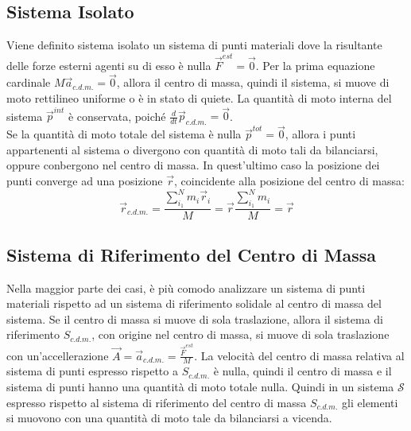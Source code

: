 \documentclass{article}
\numberwithin{equation}{subsection}
\begin{document}
\subsection{Sistema Isolato}
Viene definito sistema isolato un sistema di punti materiali dove la risultante delle 
forze esterni agenti su di esso è nulla $\vec{F}^{est}=\vec{0}$. 
Per la prima equazione cardinale $M\vec{a}_{c.d.m.}=\vec{0}$, allora il centro di massa, quindi il sistema, si muove di moto rettilineo 
uniforme o è in stato di quiete. La quantità di moto interna del sistema $\vec{p}^{int}$ 
è conservata, poiché $\displaystyle\frac{d}{dt}\vec{p}_{c.d.m.}=\vec{0}$.
\\
Se la quantità di moto totale del sistema è nulla $\vec{p}^{tot}=\vec{0}$, allora 
i punti appartenenti al sistema o divergono con quantità di 
moto tali da bilanciarsi, oppure conbergono nel centro di 
massa. In quest'ultimo caso la posizione dei punti converge 
ad una posizione $\vec{r}$, coincidente alla posizione del centro di massa:
\begin{equation}
    \vec{r}_{c.d.m.}=\displaystyle\frac{\sum_{i_1}^{N}m_i\vec{r}_i}{M}=\vec{r}\frac{\sum_{i_1}^{N}m_i}{M}=\vec{r}
\end{equation}

\subsection{Sistema di Riferimento del Centro di Massa}
Nella maggior parte dei casi, è più comodo analizzare un sistema di punti materiali rispetto ad un sistema di riferimento solidale al centro di massa del sistema. 
Se il centro di massa si muove di sola traslazione, allora
il sistema di riferimento $S_{c.d.m.}$, con origine nel centro 
di massa, si muove di sola traslazione con un'accellerazione 
$\vec{A}=\vec{a}_{c.d.m.}=\displaystyle\frac{\vec{F}^{est}}{M}$. 
La velocità del centro di massa relativa al sistema di punti espresso rispetto a $S_{c.d.m.}$ è nulla, quindi il centro di massa e il sistema di punti hanno una quantità 
di moto totale nulla. Quindi in un sistema $\mathscr{S}$ espresso rispetto al sistema di riferimento del centro di massa $S_{c.d.m.}$ gli elementi 
si muovono con una quantità di moto tale da bilanciarsi a vicenda. 
\end{document}
